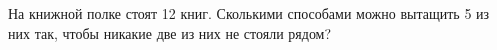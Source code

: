 \question
На книжной полке стоят 12 книг. Сколькими способами можно вытащить 5 из них так, чтобы никакие две из них не стояли рядом?

